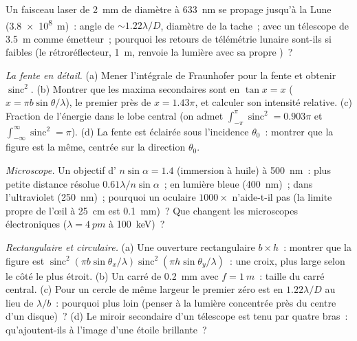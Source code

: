 \begin{exercise}[$\star$]\label{exo:b2:diffraction:4}
Un faisceau laser de \qty{2}{mm} de diamètre à \qty{633}{nm} se propage jusqu'à la Lune
(\qty{3.8e8}{m})~: angle de  $\sim1.22\lambda/D$, diamètre de la tache~;
avec un télescope de \qty{3.5}{m} comme émetteur~; pourquoi les retours de télémétrie lunaire sont-ils si
faibles (le rétroréflecteur, \qty{1}{m}, renvoie la lumière avec sa propre
)~?
\end{exercise}

\begin{exercise}[$\star\star$]\label{exo:b2:diffraction:5}
\emph{La fente en détail.} (a) Mener l'intégrale de Fraunhofer pour
la fente et obtenir $\operatorname{sinc}^2$. (b) Montrer que les maxima secondaires
sont en $\tan x = x$ ($x = \pi b\sin\theta/\lambda$), le premier près de $x = 1.43\pi$, et
calculer son intensité relative. (c) Fraction de l'énergie dans le
lobe central (on admet $\int_{-\pi}^\pi\operatorname{sinc}^2 = 0.903\pi$ et
$\int_{-\infty}^\infty\operatorname{sinc}^2 = \pi$). (d) La fente est éclairée sous l'incidence
$\theta_0$~: montrer que la figure est la même, centrée sur la direction $\theta_0$.
\end{exercise}

\begin{exercise}[$\star\star$]\label{exo:b2:diffraction:6}
\emph{Microscope.} Un objectif d' $n\sin\alpha = 1.4$
(immersion à huile) à \qty{500}{nm}~: plus petite distance résolue $0.61\lambda/n\sin
\alpha$~; en lumière bleue (\qty{400}{nm})~; dans l'ultraviolet (\qty{250}{nm})~; pourquoi
un oculaire $1000\times$ n'aide-t-il pas (la limite propre de l'œil à \qty{25}{cm} est
\qty{0.1}{mm})~? Que changent les microscopes électroniques ($\lambda = \qty{4}{pm}$ à
\qty{100}{keV})~?
\end{exercise}

\begin{exercise}[$\star\star$]\label{exo:b2:diffraction:7}
\emph{Rectangulaire et circulaire.} (a) Une ouverture rectangulaire $b \times h$~:
montrer que la figure est $\operatorname{sinc}^2(\pi b\sin\theta_x/\lambda)\operatorname{sinc}^2(\pi h
\sin\theta_y/\lambda)$~: une croix, plus large selon le côté le plus étroit. (b) Un carré de
\qty{0.2}{mm} avec $f = \qty{1}{m}$~: taille du carré central. (c) Pour un
cercle de même largeur le premier zéro est en $1.22\lambda/D$ au lieu de $\lambda/b$~:
pourquoi plus loin (penser à la lumière concentrée près du centre d'un
disque)~? (d) Le miroir secondaire d'un télescope est tenu par quatre bras~:
qu'ajoutent-ils à l'image d'une étoile brillante~?
\end{exercise}

